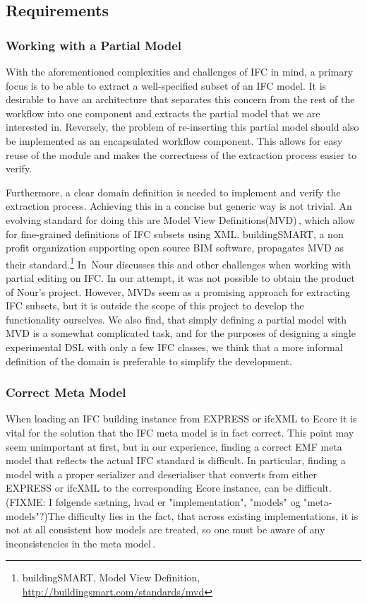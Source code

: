 \subsection{Requirements}
\label{subsec:requirements}
\subsubsection{Working with a Partial Model}
With the aforementioned complexities and challenges of IFC in mind, a primary focus is to be able to extract a well-specified subset of an IFC model. It is desirable to have an architecture that separates this concern from the rest of the workflow into one component and extracts the partial model that we are interested in. Reversely, the problem of re-inserting this partial model should also be implemented as an encapsulated workflow component. This allows for easy reuse of the module and makes the correctness of the extraction process easier to verify.

Furthermore, a clear domain definition is needed to implement and verify the extraction process. Achieving this in a concise but generic way is not trivial. An evolving standard for doing this are Model View Definitions(MVD)\,\cite{nour08}, which allow for fine-grained definitions of IFC subsets using XML. buildingSMART, a non profit organization supporting open source BIM software, propagates MVD as their standard.\footnote{buildingSMART, Model View Definition, \url{http://buildingsmart.com/standards/mvd}} In\,\cite{nour08} Nour discusses this and other challenges when working with partial editing on IFC. In our attempt, it was not possible to obtain the product of Nour's project. However, MVDs seem as a promising approach for extracting IFC subsets, but it is outside the scope of this project to develop the functionality ourselves. We also find, that simply defining a partial model with MVD is a somewhat complicated task, and for the purposes of designing a single experimental DSL with only a few IFC classes, we think that a more informal definition of the domain is preferable to simplify the development.

\subsubsection{Correct Meta Model}
When loading an IFC building instance from EXPRESS or ifcXML to Ecore it is vital for the solution that the IFC meta model is in fact correct. This point may seem unimportant at first, but in our experience, finding a correct EMF meta model that reflects the actual IFC standard is difficult. In particular, finding a model with a proper serializer and deserialiser that converts from either EXPRESS or ifcXML to the corresponding Ecore instance, can be difficult. (FIXME: I følgende sætning, hvad er "implementation", "models" og "meta-models"?)The difficulty lies in the fact, that across existing implementations, it is not at all consistent how models are treated, so one must be aware of any inconsistencies in the meta model\,\cite[pp. 4]{quteprints37725}. %

